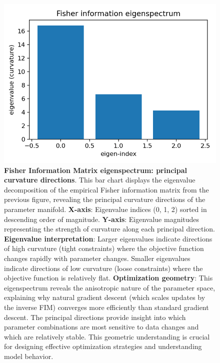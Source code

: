 \documentclass[
  10pt,
]{article}
\begin{document}
\begin{figure}
\centering
\includegraphics{../output/figures/fisher_information_eigenspectrum.png}
\caption{\textbf{Fisher Information Matrix eigenspectrum: principal
curvature directions}. This bar chart displays the eigenvalue
decomposition of the empirical Fisher information matrix from the
previous figure, revealing the principal curvature directions of the
parameter manifold. \textbf{X-axis}: Eigenvalue indices (0, 1, 2) sorted
in descending order of magnitude. \textbf{Y-axis}: Eigenvalue magnitudes
representing the strength of curvature along each principal direction.
\textbf{Eigenvalue interpretation}: Larger eigenvalues indicate
directions of high curvature (tight constraints) where the objective
function changes rapidly with parameter changes. Smaller eigenvalues
indicate directions of low curvature (loose constraints) where the
objective function is relatively flat. \textbf{Optimization geometry}:
This eigenspectrum reveals the anisotropic nature of the parameter
space, explaining why natural gradient descent (which scales updates by
the inverse FIM) converges more efficiently than standard gradient
descent. The principal directions provide insight into which parameter
combinations are most sensitive to data changes and which are relatively
stable. This geometric understanding is crucial for designing effective
optimization strategies and understanding model behavior.}
\end{figure}
\end{document}
